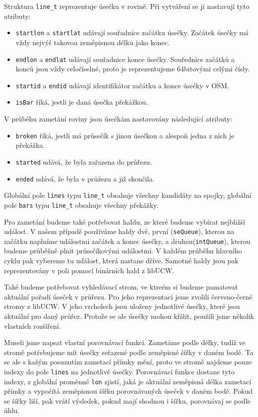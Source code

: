 Struktura \verb|line_t| reprezentuje úsečku v rovině. Při vytváření se jí
nastavují tyto atributy:
\begin{itemize}
	\item \verb|startlon| a \verb|startlat| udávají souřadnice začátku
	úsečky. Začátek úsečky má vždy nejvýš takovou zeměpisnou délku jako
	konec.
	\item \verb|endlon| a \verb|endlat| udávají souřadnice konce úsečky.
	Souřednice začátků a konců jsou vždy celočíselné, proto je
	reprezentujeme 64bitovými celými čísly.
	\item \verb|startid| a \verb|endid| udávají identifikátor začátku a
	konce úsečky v OSM.
	\item \verb|isBar| říká, jestli je daná úsečka překážkou.
\end{itemize}
V průběhu zametání roviny jsou úsečkám nastavovány následující atributy:
\begin{itemize}
	\item \verb|broken| říká, jestli má průsečík s jinou úsečkou a alespoň
	jedna z nich je překážka.
	\item \verb|started| udává, že byla zařazena do průřezu.
	\item \verb|ended| udává, že byla v průžezu a již skončila.
\end{itemize}

Globální pole \verb|lines| typu \verb|line_t| obsahuje všechny kandidáty na
spojky, globální pole \verb|bars| typu \verb|line_t| obsahuje všechny překážky. 

Pro zametání budeme také potřebovat haldu, ze které budeme vybírat nejbližší
událost. V našem případě používáme haldy dvě, první (\verb|seQueue|), kterou na
začátku naplníme událostmi začátek a konec úsečky, a druhou(\verb|intQueue|),
kterou budeme průběžně plnit průsečíkovými událostmi. V každém průběhu hlavního
cyklu pak vybereme tu událost, která nastane dříve. Samotné haldy jsou pak
reprezentovány v poli pomocí binárních hald z libUCW. 

Také budeme potřebovat vyhledávací strom, ve ktreém si budeme pamatovat aktuální
pořadí úseček v průřezu. Pro jeho reprezentaci jsme zvolili červeno-černé stromy
z libUCW. V jeho vrcholech jsou uloženy jednotlivé úsečky, které jsou aktuální
pro daný průřez. Protože se ale úsečky mohou křížit, použili jsme několik
vlastních rozšíření. 

Museli jsme napsat vlastní {\tuc porovnávací funkci}. Zametáme podle délky,
tudíž ve stromě potřebujeme mít úsečky seřazené podle zeměpisné šířky v daném
bodě. Ta se ale s kažým posunutím zametací přímky mění, proto ve stromě najdeme
pouze indexy do pole \verb|lines| na jednotlivé úsečky. Porovnávací funkce
dostane tyto indexy, z globální proměnné \verb|lon| zjistí, jaká je aktuální
zeměpisná délka zametací přímky a vypočítá zeměpisnou šířku porovnávaných úseček
v daném bodě. Pokud se šířky liší, pak vrátí výsledek, pokud mají shodnou i
šířku, porovnávaj se podle úhlu. 

